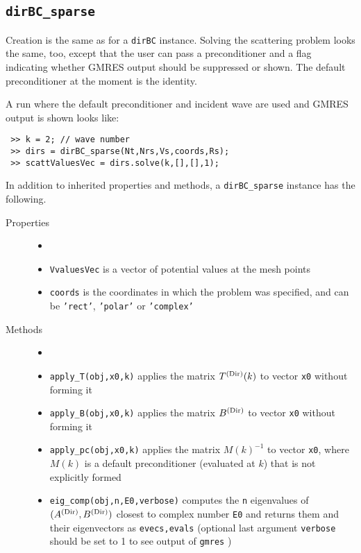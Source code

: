 \subsection{{\tt dirBC\_sparse}}
\label{sec-dirBC_sparse}

Creation is the same as for a {\tt dirBC} instance.
Solving the scattering problem looks the same, too, 
except that the user can pass a preconditioner and
a flag indicating whether GMRES output should be 
suppressed or shown. The default preconditioner
at the moment is the identity.

A run where the default preconditioner and
incident wave are used
and GMRES output is shown looks like:
\begin{verbatim}
 >> k = 2; // wave number
 >> dirs = dirBC_sparse(Nt,Nrs,Vs,coords,Rs);
 >> scattValuesVec = dirs.solve(k,[],[],1);
\end{verbatim}

In addition to inherited properties and methods,
a {\tt dirBC\_sparse} instance has the following.
\begin{description}
 \item[Properties]
   \begin{itemize}
    \item[]
    \item {\tt VvaluesVec} is a vector of potential
          values at the mesh points
    \item {\tt coords} is the coordinates in which
          the problem was specified, and can be
          {\tt 'rect'}, {\tt 'polar'} or {\tt 'complex'}
   \end{itemize}
 \item[Methods]
   \begin{itemize}
    \item[]
    \item {\tt apply\_T(obj,x0,k)} applies the matrix
          $T^{(\text{Dir})}(k)$ to vector {\tt x0} without forming it
    \item {\tt apply\_B(obj,x0,k)} applies the matrix
          $B^{(\text{Dir})}$ to vector {\tt x0} without forming it
    \item {\tt apply\_pc(obj,x0,k)} applies the matrix
          $M(k)^{-1}$ to vector {\tt x0},
          where $M(k)$ is a default
          preconditioner (evaluated at $k$) that is
          not explicitly formed
    \item {\tt eig\_comp(obj,n,E0,verbose)} computes
          the {\tt n} eigenvalues of $(A^{(\text{Dir})},B^{(\text{Dir})})$ closest
          to complex number {\tt E0} and returns 
          them and their eigenvectors as
          {\tt evecs,evals} (optional last argument
          {\tt verbose} should be set to 1 to see
          output of {\tt gmres} )           
   \end{itemize}
\end{description}

